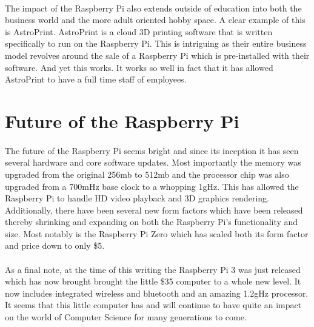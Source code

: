 \documentclass[
10pt, %
a4paper, %
oneside, %
headinclude,footinclude, %
BCOR5mm, %
]{scrartcl}
\begin{document}
\paragraph{}
The impact of the Raspberry Pi also extends outside of education into both the business world and the more adult oriented hobby space.
A clear example of this is AstroPrint.
AstroPrint is a cloud 3D printing software that is written specifically to run on the Raspberry Pi.
This is intriguing as their entire business model revolves around the sale of a Raspberry Pi which is pre-installed with their software.
And yet this works. It works so well in fact that it has allowed AstroPrint to have a full time staff of employees.

\section{Future of the Raspberry Pi}

\paragraph{}
The future of the Raspberry Pi seems bright and since its inception it has seen several hardware and core software updates.
Most importantly the memory was upgraded from the original 256mb to 512mb and the processor chip was also upgraded from a 700mHz base clock to a whopping 1gHz.
This has allowed the Raspberry Pi to handle HD video playback and 3D graphics rendering.
Additionally, there have been several new form factors which have been released thereby shrinking and expanding on both the Raspberry Pi's functionality and size.
Most notably is the Raspberry Pi Zero which has scaled both its form factor and price down to only \$5.

\paragraph{}
As a final note, at the time of this writing the Raspberry Pi 3 was just released which has now brought brought the little \$35 computer to a whole new level.
It now includes integrated wireless and bluetooth and an amazing 1.2gHz processor.
It seems that this little computer has and will continue to have quite an impact on the world of Computer Science for many generations to come.


\newpage %

\renewcommand{\refname}{\spacedlowsmallcaps{References}} %




\end{document}

